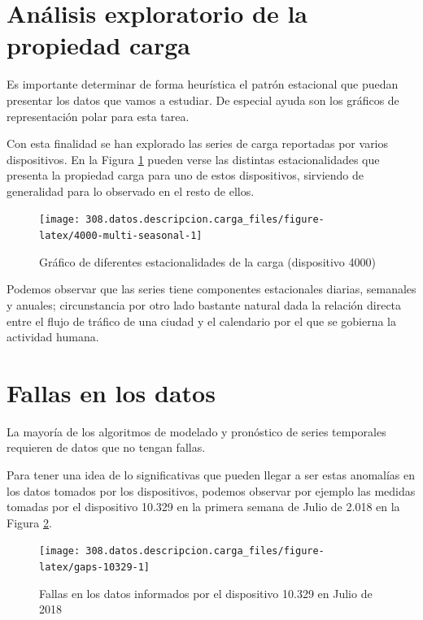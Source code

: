 \documentclass[]{book}
\begin{document}
\section{Análisis exploratorio de la propiedad
carga}\label{analisis-exploratorio-de-la-propiedad-carga}

Es importante determinar de forma heurística el patrón estacional que
puedan presentar los datos que vamos a estudiar. De especial ayuda son
los gráficos de representación polar para esta tarea.

Con esta finalidad se han explorado las series de carga reportadas por
varios dispositivos. En la Figura \ref{fig:4000-multi-seasonal} pueden
verse las distintas estacionalidades que presenta la propiedad carga
para uno de estos dispositivos, sirviendo de generalidad para lo
observado en el resto de ellos.

\begin{figure}

{\centering \texttt{[image: 308.datos.descripcion.carga\_files/figure-latex/4000-multi-seasonal-1]} 

}

\caption{Gráfico de diferentes estacionalidades de la carga (dispositivo 4000)}\label{fig:4000-multi-seasonal}
\end{figure}

Podemos observar que las series tiene componentes estacionales diarias,
semanales y anuales; circunstancia por otro lado bastante natural dada
la relación directa entre el flujo de tráfico de una ciudad y el
calendario por el que se gobierna la actividad humana.

\section{Fallas en los datos}\label{fallas-en-los-datos}

La mayoría de los algoritmos de modelado y pronóstico de series
temporales requieren de datos que no tengan fallas.

Para tener una idea de lo significativas que pueden llegar a ser estas
anomalías en los datos tomados por los dispositivos, podemos observar
por ejemplo las medidas tomadas por el dispositivo 10.329 en la primera
semana de Julio de 2.018 en la Figura \ref{fig:gaps-10329}.

\begin{figure}

{\centering \texttt{[image: 308.datos.descripcion.carga\_files/figure-latex/gaps-10329-1]} 

}

\caption{Fallas en los datos informados por el dispositivo 10.329 en Julio de 2018}\label{fig:gaps-10329}
\end{figure}
\end{document}
